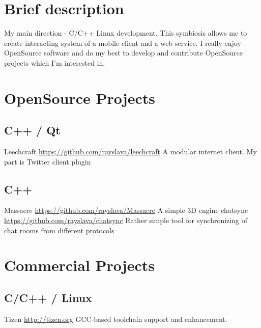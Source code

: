 \documentclass[11pt,a4paper]{moderncv}
\begin{document}
\maketitle

\section{Brief description}
\cvitem
  {}
  {My main direction - C/C++ Linux development.\newline{}
  This symbiosis allows me to create interacting system of a mobile client and a web service.\newline{}
  I really enjoy OpenSource software and do my best to develop and contribute OpenSource projects which I'm interested in.}

\section{OpenSource Projects}
\subsection{C++ / Qt}
\cvitem
  {Leechcraft}
  {\url{https://github.com/rayslava/leechcraft}\newline{}
  A modular internet client. My part is Twitter client plugin}
\subsection{C++}
\cvitem
  {Massacre}
  {\url{https://github.com/rayslava/Massacre}\newline{}
  A simple 3D engine}
\cvitem
  {chatsync}
  {\url{https://github.com/rayslava/chatsync}\newline{}
  Rather simple tool for synchronizing of chat rooms from different protocols}

\section{Commercial Projects}
  \subsection{C/C++ / Linux}
  \cvitem
    {Tizen}
    {\url{http://tizen.org}\newline{}
    GCC-based toolchain support and enhancement.}
\end{document}
